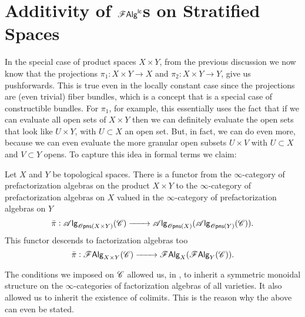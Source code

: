 \documentclass[../text.tex]{subfiles}
\begin{document}
\section{Additivity of \texorpdfstring{$\mathscr{F} \mathsf{Alg}^{\mathsf{lc}}$}{lcfa}s on Stratified Spaces}


In the special case of product spaces $X \times Y$, from the previous discussion we now know that the projections $\pi_1: X \times Y \rightarrow X$ and $\pi_2: X \times Y \rightarrow Y$, give us pushforwards. This is true even in the locally constant case since the projections are (even trivial) fiber bundles, which is a concept that is a special case of constructible bundles. For $\pi_1$, for example, this essentially uses the fact that if we can evaluate all open sets of $X \times Y$ then we can definitely evaluate the open sets that look like $U \times Y$, with $U \subset X$ an open set. But, in fact, we can do even more, because we can even evaluate the more granular open subsets $U \times V$ with $U \subset X$ and $V \subset Y$ opens. To capture this idea in formal terms we claim:
%
\begin{proposition}\label{prop:exp_of_products}
    Let $X$ and $Y$ be topological spaces. There is a functor from the $\infty$-category of prefactorization algebras on the product $X \times Y$ to the $\infty$-category of prefactorization algebras on $X$ valued in the $\infty$-category of prefactorization algebras on $Y$
    \begin{equation}
        \bar{\pi}: \alg{\opens(X \times Y)}(\catC) \xrightarrow{\qquad} \alg{\opens(X)} (\alg{\opens(Y)} (\catC)).
    \end{equation}
    This functor descends to factorization algebras too
    \begin{equation}
        \bar{\pi}: \mathscr{F} \mathsf{Alg}_{X \times Y}(\mathscr{C}) \xrightarrow{\qquad} \mathscr{F} \mathsf{Alg}_{X}(\mathscr{F} \mathsf{Alg}_{Y}(\mathscr{C})).
    \end{equation}
\end{proposition}

\begin{remark}
    The conditions we imposed on $\mathscr{C}$ allowed us, in , to inherit a symmetric monoidal structure on the $\infty$-categories of factorization algebras of all varieties. It also allowed us to inherit the existence of colimits. This is the reason why the above can even be stated.
\end{remark}
\end{document}
